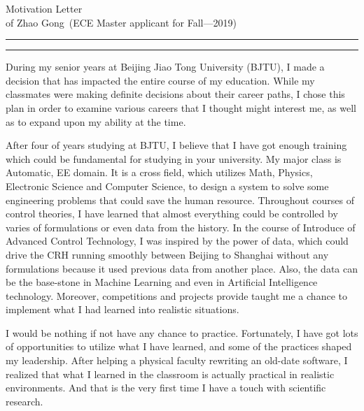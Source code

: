 \documentclass[12pt]{article}
\newcommand{\soptitle}{Motivation Letter}
\newcommand{\yourname}{Zhao Gong}
\begin{document}
\begin{center}\LARGE\soptitle\\
\large of \yourname\ (ECE Master applicant for Fall---2019)
\end{center}

\hrule
\vspace{10pt}
\hrule height 1pt

\bigskip

During my senior years at Beijing Jiao Tong University (BJTU), I made a decision that has impacted the entire course of my
 education. While my classmates were making definite decisions about their career paths, I chose this plan in order to 
 examine various careers that I thought might interest me, as well as to expand upon my ability at the time. 

After four of years studying at BJTU, I believe that I have got enough training which could be fundamental for studying 
in your university. My major class is Automatic, EE domain. It is a cross field, which utilizes Math, Physics, Electronic
 Science and Computer Science, to design a system to solve some engineering problems that could save the human resource. 
 Throughout courses of control theories, I have learned that almost everything could be controlled by varies of formulations 
 or even data from the history. In the course of Introduce of Advanced Control Technology, I was inspired by the power of 
 data, which could drive the CRH running smoothly between Beijing to Shanghai without any formulations because it used 
 previous data from another place. Also, the data can be the base-stone in Machine Learning and even in Artificial 
 Intelligence technology. Moreover, competitions and projects provide taught me a chance to implement what I had learned into realistic situations.

 
I would be nothing if not have any chance to practice. Fortunately, I have got lots of opportunities to utilize what I have learned, and some of the practices shaped my leadership. After helping a physical faculty rewriting an old-date software, I realized that what I learned in the classroom is actually practical in realistic environments. And that is the very first time I have a touch with scientific research.
\end{document}
